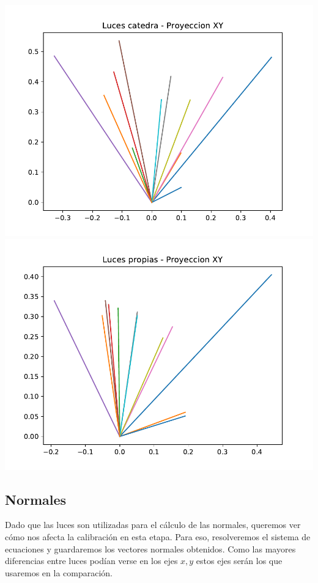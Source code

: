 {\centering
    \includegraphics[scale=0.8]{informe/imagenes/lucesCatedraProyeccionXY.pdf} \\
}
{\centering
    \includegraphics[scale=0.8]{informe/imagenes/lucesPropiasProyeccionXY.pdf} \\
}

\subsection{Normales}
Dado que las luces son utilizadas para el cálculo de las normales, queremos ver cómo nos afecta la calibración en esta etapa. Para eso, resolveremos el sistema de ecuaciones y guardaremos los vectores normales obtenidos. Como las mayores diferencias entre luces podían verse en los ejes $x, y$ estos ejes serán los que usaremos en la comparación. \\

